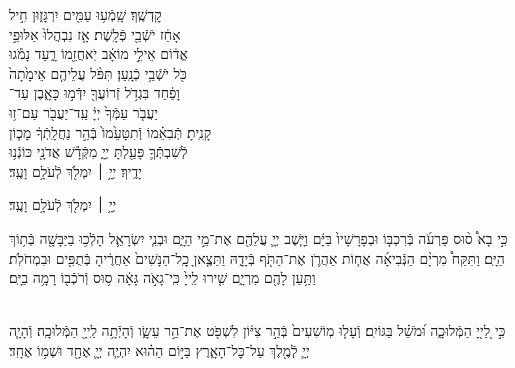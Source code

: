 \documentclass[twoside, openany, parskip=half, 11pt]{book}
\begin{document}
קׇדְשֶֽׁךָ׃ \hfill שָֽׁמְֿע֥וּ עַמִּ֖ים יִרְגָּז֑וּן \hfill חִ֣יל \\
אָחַ֔ז יֹשְֿׁבֵ֖י פְּֿלָֽשֶׁת׃ \hfill אָ֤ז נִבְהֲלוּ֙ אַלּוּפֵ֣י \\
אֱד֔וֹם \hfill אֵילֵ֣י מוֹאָ֔ב יֹֽאחֲזֵ֖מוֹ רָ֑עַד \hfill נָמֹ֕גוּ \\
כֹּ֖ל יֹשְֿׁבֵ֥י כְֿנָֽעַן׃ \hfill תִּפֹּ֨ל עֲלֵיהֶ֤ם אֵימָ֙תָה֙ \\
וָפַ֔חַד \hfill בִּגְדֹ֥ל זְֿרוֹעֲךָ֖ יִדְּֿמ֣וּ כָּאָ֑בֶן \hfill עַד־\\
יַעֲבֹ֤ר עַמְּֿךָ֙ יְיָ֔ \hfill עַֽד־יַעֲבֹ֖ר עַם־ז֥וּ \\
קָנִֽיתָ׃ \hfill תְּֿבִאֵ֗מוֹ וְֿתִטָּעֵ֙מוֹ֙ בְּֿהַ֣ר נַחֲלָֽתְֿךָ֔ \hfill מָכ֧וֹן \\
לְֿשִׁבְתְּֿֿךָ֛ פָּעַ֖לְתָּ יְיָ֑ \hfill מִקְּֿדָ֕שׁ אֲדֹנָ֖י כּוֹנְֿנ֥וּ \\
יָדֶֽיךָ׃ \hfill יְיָ֥ ׀ יִמְלֹ֖ךְ לְֿעֹלָ֥ם וָעֶֽד׃\hfill \break
\begin{small}
יְיָ֥ ׀ יִמְלֹ֖ךְ לְֿעֹלָ֥ם וָעֶֽד׃\\
\end{small}
\begin{small}
כִּ֣י בָא֩ ס֨וּס פַּרְעֹ֜ה בְּֿרִכְבּ֤וֹ וּבְפָרָשָׁיו֙ בַּיָּ֔ם וַיָּ֧שֶׁב יְיָ֛ עֲלֵהֶ֖ם אֶת־מֵ֣י הַיָּ֑ם וּבְנֵ֧י יִשְׂרָאֵ֛ל הָלְֿכ֥וּ בַיַּבָּשָׁ֖ה בְּֿת֥וֹךְ הַיָּֽם׃ וַתִּקַּח֩ מִרְיָ֨ם הַנְּֿבִיאָ֜ה אֲח֧וֹת אַהֲרֹ֛ן אֶת־הַתֹּ֖ף בְּֿיָדָ֑הּ וַתֵּצֶ֤אןָ כׇֽל־הַנָּשִׁים֙ אַחֲרֶ֔יהָ בְּֿתֻפִּ֖ים וּבִמְחֹלֹֽת׃ וַתַּ֥עַן לָהֶ֖ם מִרְיָ֑ם שִׁ֤ירוּ לַֽייָ֙ כִּֽי־גָאֹ֣ה גָּאָ֔ה ס֥וּס וְֿרֹכְֿב֖וֹ רָמָ֥ה בַיָּֽם׃\end{small}
\\
כִּ֣י לַ֭ייָ֭ הַמְּֿלוּכָ֑ה וּ֝מֹשֵׁ֗ל בַּגּוֹיִֽם׃
וְֿעָל֤וּ מֽוֹשִׁעִים֙ בְּֿהַ֣ר צִיּ֔וֹן לִשְׁפֹּ֖ט אֶת־הַ֣ר עֵשָׂ֑ו וְֿהָיְֿתָ֥ה לַֽייָ֖ הַמְּֿלוּכָֽה׃
וְֿהָיָ֧ה יְיָ֛ לְֿמֶ֖לֶךְ עַל־כׇּל־הָאָ֑רֶץ בַּיּ֣וֹם הַה֗וּא יִהְיֶ֧ה יְיָ֛ אֶחָ֖ד וּשְׁמ֥וֹ אֶחָֽד׃
\end{document}
